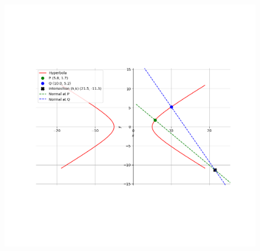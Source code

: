 \documentclass[journal]{IEEEtran}
\begin{document}
    \begin{figure}[H]
    \centering
    \includegraphics[width=1.1\columnwidth]{figs/Figure_1.png}
    \label{fig:placeholder}
    \caption{}
\end{figure}
\end{document}
